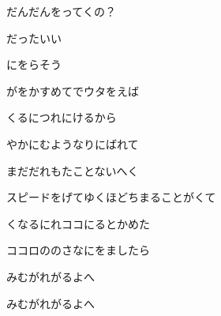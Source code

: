 \documentclass[14pt]{ltjsarticle}
\begin{document}
{  だんだんをってくの？
  \jisho{}

  だったいい
  \jisho{}

  にをらそう
  \jisho{}

\item
  がをかすめてでウタをえば
  \jisho{}

  くるにつれにけるから
  \jisho{}

  やかにむようなりにばれて
  \jisho{}

  まだだれもたことないへく
  \jisho{}

\item
  スピードをげてゆくほどちまることがくて
  \jisho{}

  くなるにれココにるとかめた
  \jisho{}

  ココロののさなにをましたら
  \jisho{}

  みむがれがるよへ
  \jisho{}

\item
  みむがれがるよへ
  \jisho{}


}
\end{document}
